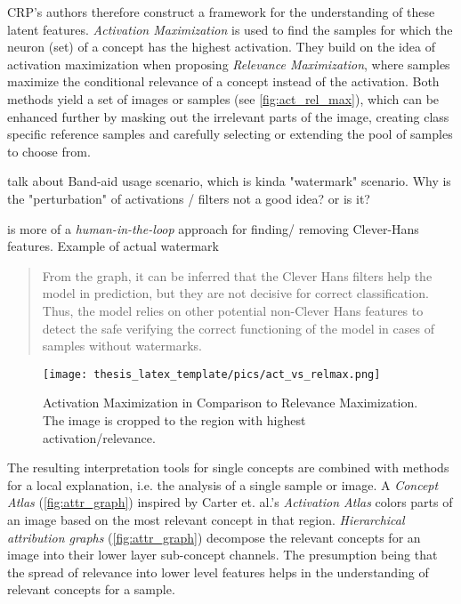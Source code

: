 CRP's authors therefore construct a framework for the understanding of these latent features. \textit{Activation Maximization} is used to find the samples for which the neuron (set) of a concept has the highest activation. They build on the idea of activation maximization when proposing \textit{Relevance Maximization}, where samples maximize the conditional relevance of a concept instead of the activation. Both methods yield a set of images or samples (see \autoref{fig:act_rel_max}), which can be enhanced further by masking out the irrelevant parts of the image, creating class specific reference samples and carefully selecting or extending the pool of samples to choose from. 

talk about Band-aid usage scenario, which is kinda "watermark" scenario. Why is the "perturbation" of activations / filters not a good idea? or is it?

is more of a \textit{human-in-the-loop} approach for finding/ removing Clever-Hans features. Example of actual watermark
\begin{quote}
From the graph, it can be inferred that the Clever Hans filters help the model in prediction, but they are not decisive for correct classification. Thus, the model relies on other potential non-Clever Hans features to detect the safe verifying the correct functioning of the model in cases of samples without watermarks.
\end{quote}

\begin{figure}[htbp]
    \centering
	\texttt{[image: thesis\_latex\_template/pics/act\_vs\_relmax.png]}
    \caption[ActMax vs. RelMax]{Activation Maximization in Comparison to Relevance Maximization. The image is cropped to the region with highest activation/relevance. }
    \label{fig:act_rel_max}
\end{figure}

The resulting interpretation tools for single concepts are combined with methods for a local explanation, i.e. the analysis of a single sample or image. A \textit{Concept Atlas} (\cref{fig:attr_graph}) inspired by Carter et. al.'s \textit{Activation Atlas}  colors parts of an image based on the most relevant concept in that region. \textit{Hierarchical attribution graphs} (\cref{fig:attr_graph}) decompose the relevant concepts for an image into their lower layer sub-concept channels. The presumption being that the spread of relevance into lower level features helps in the understanding of relevant concepts for a sample.

